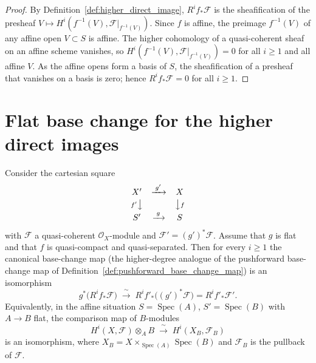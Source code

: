 \begin{proof}
  By Definition~\ref{def:higher_direct_image}, \(R^i f_*\mathcal{F}\) is the
  sheafification of the presheaf \(V \mapsto H^i(f^{-1}(V),
  \mathcal{F}|_{f^{-1}(V)})\). Since \(f\) is affine, the preimage \(f^{-1}(V)\) of
  any affine open \(V \subset S\) is affine. The higher cohomology of a
  quasi-coherent sheaf on an affine scheme vanishes, so
  \(H^i(f^{-1}(V), \mathcal{F}|_{f^{-1}(V)}) = 0\) for all \(i \geq 1\) and all
  affine \(V\). As the affine opens form a basis of \(S\), the sheafification of a
  presheaf that vanishes on a basis is zero; hence \(R^i f_*\mathcal{F} = 0\) for
  all \(i \geq 1\).
\end{proof}

\section{Flat base change for the higher direct images}

\begin{theorem}
  \label{thm:flat_base_change_higher}
  Consider the cartesian square
  \[
    \begin{array}{ccc}
      X' & \xrightarrow{\;g'\;} & X \\[2pt]
      {\scriptstyle f'}\big\downarrow & & \big\downarrow{\scriptstyle f} \\[2pt]
      S' & \xrightarrow{\;g\;} & S
    \end{array}
  \]
  with \(\mathcal{F}\) a quasi-coherent \(\mathcal{O}_X\)-module and
  \(\mathcal{F}' = (g')^*\mathcal{F}\). Assume that \(g\) is flat and that \(f\) is
  quasi-compact and quasi-separated. Then for every \(i \geq 1\) the canonical
  base-change map (the higher-degree analogue of the pushforward base-change map
  of Definition~\ref{def:pushforward_base_change_map}) is an isomorphism
  \[
    g^*\bigl(R^i f_*\mathcal{F}\bigr) \;\xrightarrow{\;\sim\;}\;
    R^i f'_*\bigl((g')^*\mathcal{F}\bigr) = R^i f'_*\mathcal{F}' .
  \]
  Equivalently, in the affine situation \(S = \operatorname{Spec}(A)\),
  \(S' = \operatorname{Spec}(B)\) with \(A \to B\) flat, the comparison map of
  \(B\)-modules
  \[
    H^i(X, \mathcal{F}) \otimes_A B \;\xrightarrow{\;\sim\;}\;
    H^i(X_B, \mathcal{F}_B)
  \]
  is an isomorphism, where \(X_B = X \times_{\operatorname{Spec}(A)}
  \operatorname{Spec}(B)\) and \(\mathcal{F}_B\) is the pullback of
  \(\mathcal{F}\).
\end{theorem}

